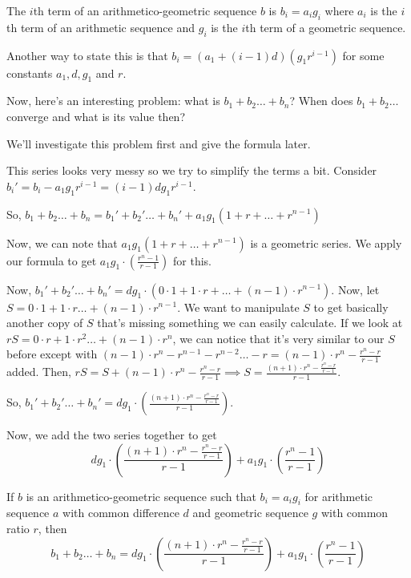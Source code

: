 \documentclass[11pt]{article}
\begin{document}
\begin{defi}
The $i$th term of an arithmetico-geometric sequence $b$ is $b_{i}=a_{i}g_{i}$ where $a_{i}$ is the $i$th term of an arithmetic sequence and $g_{i}$ is the $i$th term of a geometric sequence.

Another way to state this is that $b_{i}=(a_{1}+(i-1)d)(g_{1}r^{i-1})$ for some constants $a_{1},d,g_{1}$ and $r$.
\end{defi}

Now, here's an interesting problem: what is $b_{1}+b_{2}\ldots+b_{n}$? When does $b_{1}+b_{2}\ldots $ converge and what is its value then?

We'll investigate this problem first and give the formula later.
\begin{pro}
This series looks very messy so we try to simplify the terms a bit.
Consider $b_{i}'=b_{i}-a_{1}g_{1}r^{i-1}=(i-1)dg_{1}r^{i-1}$. 

So, $b_{1}+b_{2}\ldots + b_{n}=b_{1}'+b_{2}'\ldots + b_{n}'+a_{1}g_{1}(1+r+\ldots + r^{n-1})$

Now, we can note that $a_{1}g_{1}(1+r+\ldots + r^{n-1})$ is a geometric series. We apply our formula to get $a_{1}g_{1}\cdot (\frac{r^{n}-1}{r-1})$ for this.

Now, $b_{1}'+b_{2}'\ldots + b_{n}'=dg_{1}\cdot (0\cdot 1+1\cdot r+\ldots + (n-1)\cdot r^{n-1})$. Now, let $S=0\cdot 1+1\cdot r \ldots + (n-1)\cdot r^{n-1}$. We want to manipulate $S$ to get basically another copy of $S$ that's missing something we can easily calculate. If we look at $rS=0\cdot r+1\cdot r^2\ldots +(n-1)\cdot r^{n}$, we can notice that it's very similar to our $S$ before except with $(n-1)\cdot r^{n}-r^{n-1}-r^{n-2}\ldots-r=(n-1)\cdot r^{n}-\frac{r^{n}-r}{r-1}$ added. Then, $rS=S+(n-1)\cdot r^{n}-\frac{r^{n}-r}{r-1}\implies S=\frac{(n+1)\cdot r^{n}-\frac{r^{n}-r}{r-1}}{r-1}$.

So, $b_{1}'+b_{2}'\ldots + b_{n}'=dg_{1}\cdot (\frac{(n+1)\cdot r^{n}-\frac{r^{n}-r}{r-1}}{r-1})$. 

Now, we add the two series together to get 
$$dg_{1}\cdot (\frac{(n+1)\cdot r^{n}-\frac{r^{n}-r}{r-1}}{r-1})+a_{1}g_{1}\cdot (\frac{r^{n}-1}{r-1})$$
\end{pro}

\begin{theo}
If $b$ is an arithmetico-geometric sequence such that $b_{i}=a_{i}g_{i}$ for arithmetic sequence $a$ with common difference $d$ and geometric sequence $g$ with common ratio $r$, then 
$$b_{1}+b_{2}\ldots + b_{n} = dg_{1}\cdot (\frac{(n+1)\cdot r^{n}-\frac{r^{n}-r}{r-1}}{r-1})+a_{1}g_{1}\cdot (\frac{r^{n}-1}{r-1})$$
\end{theo}
\end{document}
